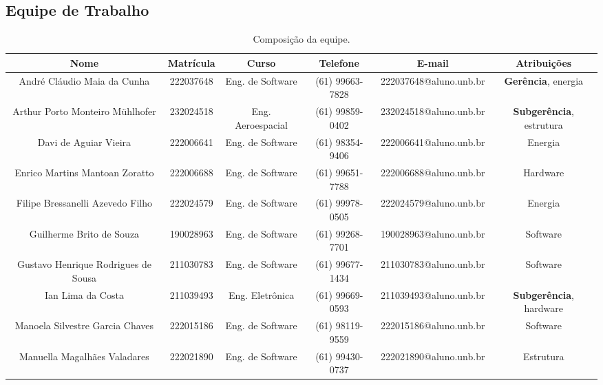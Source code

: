 \begin{landscape}

\chapter{Equipe de Trabalho}

\begin{table}[htpb]
\begin{center}
\caption{Composição da equipe.}
\begin{tabular}{|c|c|c|c|c|c|}
\hline
\textbf{Nome} & \textbf{Matrícula} & \textbf{Curso} & \textbf{Telefone} & \textbf{E-mail} & \textbf{Atribuições}\\ \hline
André Cláudio Maia da Cunha           & 222037648        & Eng. de Software     & (61) 99663-7828   & 222037648@aluno.unb.br & \textbf{Gerência}, energia\\ \hline
Arthur Porto Monteiro Mühlhofer       & 232024518        & Eng. Aeroespacial    & (61) 99859-0402   & 232024518@aluno.unb.br & \textbf{Subgerência}, estrutura \\ \hline
Davi de Aguiar Vieira                 & 222006641        & Eng. de Software     & (61) 98354-9406   & 222006641@aluno.unb.br & Energia \\ \hline
Enrico Martins Mantoan Zoratto        & 222006688        & Eng. de Software     & (61) 99651-7788   & 222006688@aluno.unb.br & Hardware \\ \hline
Filipe Bressanelli Azevedo Filho      & 222024579        & Eng. de Software     & (61) 99978-0505   & 222024579@aluno.unb.br & Energia \\ \hline
Guilherme Brito de Souza              & 190028963        & Eng. de Software     & (61) 99268-7701   & 190028963@aluno.unb.br & Software \\ \hline
Gustavo Henrique Rodrigues de Sousa   & 211030783        & Eng. de Software     & (61) 99677-1434   & 211030783@aluno.unb.br & Software \\ \hline
Ian Lima da Costa                     & 211039493        & Eng. Eletrônica      & (61) 99669-0593   & 211039493@aluno.unb.br & \textbf{Subgerência}, hardware \\ \hline
Manoela Silvestre Garcia Chaves       & 222015186        & Eng. de Software     & (61) 98119-9559   & 222015186@aluno.unb.br & Software \\ \hline
Manuella Magalhães Valadares          & 222021890        & Eng. de Software     & (61) 99430-0737   & 222021890@aluno.unb.br & Estrutura \\ \hline

\end{tabular}
\end{center}
\end{table}
\end{landscape}

